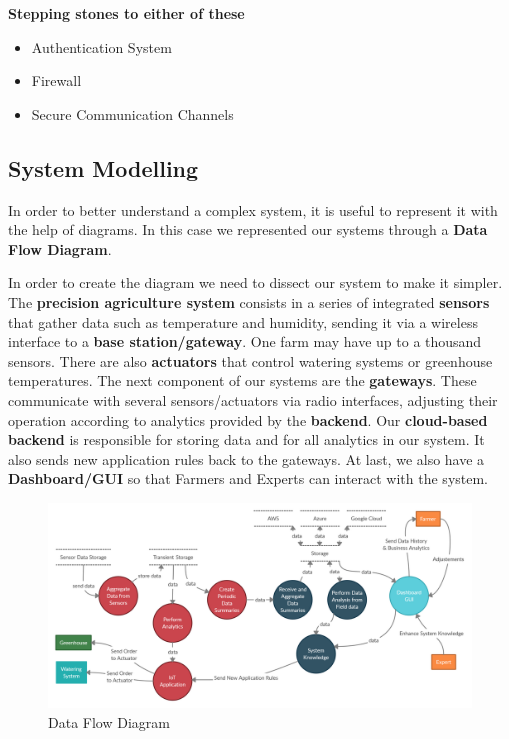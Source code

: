 \textbf{Stepping stones to either of these}
\begin{itemize}
  \item Authentication System
  \item Firewall
  \item Secure Communication Channels
\end{itemize}



\subsection{System Modelling}

In order to better understand a complex system, it is useful to represent it with the help of diagrams. In this case we represented our systems through a \textbf{Data Flow Diagram}.

In order to create the diagram we need to dissect our system to make it simpler. The \textbf{precision agriculture system} consists in a series of integrated \textbf{sensors} that gather data such as temperature and humidity, sending it via a wireless interface to a \textbf{base station/gateway}. One farm may have up to a thousand sensors. There are also \textbf{actuators} that control watering systems or greenhouse temperatures. The next component of our systems are the \textbf{gateways}. These communicate with several sensors/actuators via radio interfaces, adjusting their operation according to analytics provided by the \textbf{backend}. Our \textbf{cloud-based backend} is responsible for storing data and for all analytics in our system. It also sends new application rules back to the gateways. At last, we also have a \textbf{Dashboard/GUI} so that Farmers and Experts can interact with the system.

 \begin{figure}[ht!]
 	\centering
 	\includegraphics[width=1\linewidth]{img/dfd.png}
 	\caption{Data Flow Diagram}
 \end{figure}
 
